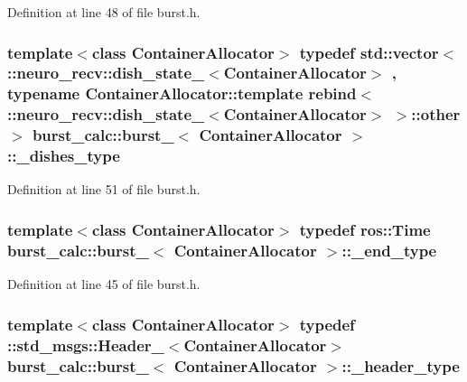 \-Definition at line 48 of file burst.\-h.

\subsubsection[{\-\_\-dishes\-\_\-type}]{\setlength{\rightskip}{0pt plus 5cm}template$<$class \-Container\-Allocator$>$ typedef std\-::vector$<$ \-::neuro\-\_\-recv\-::dish\-\_\-state\-\_\-$<$\-Container\-Allocator$>$ , typename \-Container\-Allocator\-::template rebind$<$ \-::neuro\-\_\-recv\-::dish\-\_\-state\-\_\-$<$\-Container\-Allocator$>$ $>$\-::other $>$ {\bf burst\-\_\-calc\-::burst\-\_\-}$<$ \-Container\-Allocator $>$\-::{\bf \-\_\-dishes\-\_\-type}}\label{structburst__calc_1_1burst___a20be10ccf91c3607841556b94929fcaa}


\-Definition at line 51 of file burst.\-h.

\subsubsection[{\-\_\-end\-\_\-type}]{\setlength{\rightskip}{0pt plus 5cm}template$<$class \-Container\-Allocator$>$ typedef ros\-::\-Time {\bf burst\-\_\-calc\-::burst\-\_\-}$<$ \-Container\-Allocator $>$\-::{\bf \-\_\-end\-\_\-type}}\label{structburst__calc_1_1burst___ab609a6790921638872018c6aecf5422b}


\-Definition at line 45 of file burst.\-h.

\subsubsection[{\-\_\-header\-\_\-type}]{\setlength{\rightskip}{0pt plus 5cm}template$<$class \-Container\-Allocator$>$ typedef \-::std\-\_\-msgs\-::\-Header\-\_\-$<$\-Container\-Allocator$>$ {\bf burst\-\_\-calc\-::burst\-\_\-}$<$ \-Container\-Allocator $>$\-::{\bf \-\_\-header\-\_\-type}}\label{structburst__calc_1_1burst___a853436aa625ee722a0da5c14fd57c07a}


